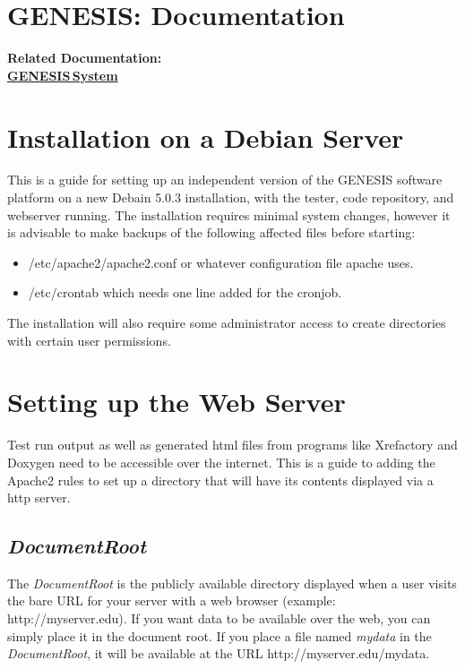 \documentclass[12pt]{article}
\begin{document}
\section*{GENESIS: Documentation}

{\bf Related Documentation:} \\
\href{../genesis-system/genesis-system.tex}{\bf GENESIS\,System}

\section*{Installation on a Debian Server}

This is a guide for setting up an independent version of the GENESIS software platform on a new Debain 5.0.3 installation, with the tester, code repository, and webserver running. The installation requires minimal system changes, however it is advisable to make backups of the following affected files before starting:

\begin{itemize}
\item[] /etc/apache2/apache2.conf or whatever configuration file apache uses.
\item[] /etc/crontab which needs one line added for the cronjob.
\end{itemize}

The installation will also require some administrator access to create directories with certain user permissions. 

\section*{Setting up the Web Server}

Test run output as well as generated html files from programs like Xrefactory and Doxygen need to be accessible over the internet. This is a guide to adding the Apache2 rules to set up a directory that will have its contents displayed via a http server.

\subsection*{\it DocumentRoot}

The {\it DocumentRoot} is the publicly available directory displayed when a user visits the bare URL for your server with a web browser (example: http://myserver.edu). If you want data to be available over the web, you can simply place it in the document root. If you place a file named {\it mydata} in the {\it DocumentRoot}, it will be available at the URL http://myserver.edu/mydata.
\end{document}

